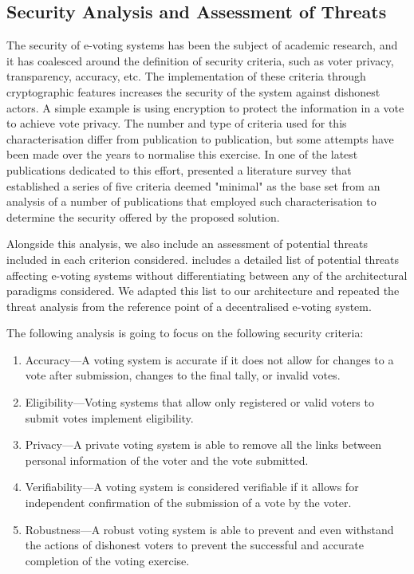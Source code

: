 \documentclass[../main.tex]{subfiles}
\begin{document}
\subsection{Security Analysis and Assessment of Threats}
The security of e-voting systems has been the subject of academic research, and it has coalesced around the definition of security criteria, such as voter privacy, transparency, accuracy, etc. The implementation of these criteria through cryptographic features increases the security of the system against dishonest actors. A simple example is using encryption to protect the information in a vote to achieve vote privacy. The number and type of criteria used for this characterisation differ from publication to publication, but some attempts have been made over the years to normalise this exercise. In one of the latest publications dedicated to this effort, \cite{Almeida2023} presented a literature survey that established a series of five criteria deemed "minimal" as the base set from an analysis of a number of publications that employed such characterisation to determine the security offered by the proposed solution.
\par
Alongside this analysis, we also include an assessment of potential threats included in each criterion considered. \cite{Zissi2011} includes a detailed list of potential threats affecting e-voting systems without differentiating between any of the architectural paradigms considered. We adapted this list to our architecture and repeated the threat analysis from the reference point of a decentralised e-voting system.
\par
The following analysis is going to focus on the following security criteria:

\begin{enumerate}

    \item{Accuracy—A voting system is accurate if it does not allow for changes to a vote after submission, changes to the final tally, or invalid votes.}

    \item{Eligibility—Voting systems that allow only registered or valid voters to submit votes implement eligibility.}

    \item{Privacy—A private voting system is able to remove all the links between personal information of the voter and the vote submitted.}

    \item{Verifiability—A voting system is considered verifiable if it allows for independent confirmation of the submission of a vote by the voter.}

    \item{Robustness—A robust voting system is able to prevent and even withstand the actions of dishonest voters to prevent the successful and accurate completion of the voting exercise.}

\end{enumerate}
\end{document}
